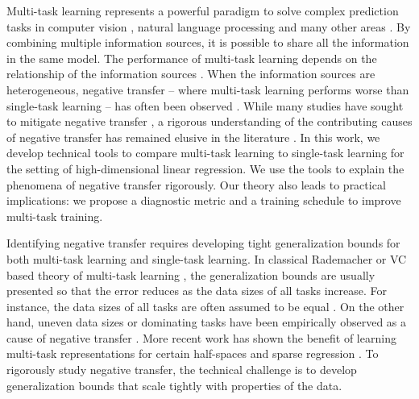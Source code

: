 Multi-task learning represents a powerful paradigm to solve complex prediction tasks in computer vision \cite{chexnet17,ZSSGM18}, natural language processing \cite{GLUE,superglue} and many other areas \cite{ZY17}.
By combining multiple information sources, it is possible to share all the information in the same model.
The performance of multi-task learning depends on the relationship of the information sources \cite{C97}.
When the information sources are heterogeneous, negative transfer -- where multi-task learning performs worse than single-task learning -- has often been observed \cite{AP16,BS17}.
While many studies have sought to mitigate negative transfer \cite{ZY17}, a rigorous understanding of the contributing causes of negative transfer has remained elusive in the literature \cite{R17}.
In this work, we develop technical tools to compare multi-task learning to single-task learning for the setting of high-dimensional linear regression. %
We use the tools to explain the phenomena of negative transfer rigorously.
Our theory also leads to practical implications: we propose a diagnostic metric and a training schedule to improve multi-task training.

Identifying negative transfer requires developing tight generalization bounds for both multi-task learning and single-task learning.
In classical Rademacher or VC based theory of multi-task learning \cite{B00,AZ05,M06}, the generalization bounds are usually presented so that the error reduces as the data sizes of all tasks increase.
For instance, the data sizes of all tasks are often assumed to be equal \cite{B00}.
On the other hand, uneven data sizes or dominating tasks have been empirically observed as a cause of negative transfer \cite{YKGLHF20}.
More recent work has shown the benefit of learning multi-task representations for certain half-spaces \cite{MPR16} and sparse regression \cite{LPTV09,LPVT11}.
To rigorously study negative transfer, the technical challenge is to develop generalization bounds that scale tightly with properties of the data.


